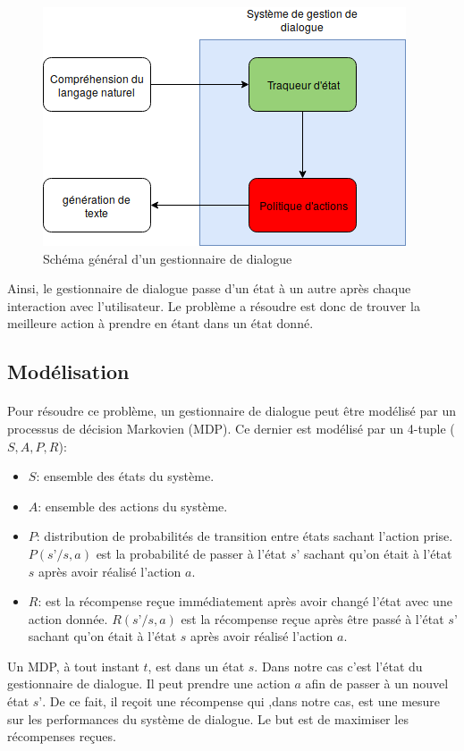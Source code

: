 \begin{figure}[H]
	\centering
	\includegraphics[width=.7\linewidth]{images/DM/DMGeneral.png} 
	\caption{Schéma général d'un gestionnaire de dialogue} 
\end{figure}
\par Ainsi, le gestionnaire de dialogue passe d'un état à un autre après chaque interaction avec l'utilisateur. Le problème a résoudre est donc de trouver la meilleure action à prendre en étant dans un état donné.
	\subsection{Modélisation}\label{MDP}
	\paragraph{}Pour résoudre ce problème, un gestionnaire de dialogue peut être modélisé par un processus de décision Markovien (MDP)\cite{Bel1957}. Ce dernier est modélisé par un 4-tuple ($S,A,P,R$):
	\begin{itemize}
		\item $S$: ensemble des états du système.
		\item $A$: ensemble des actions du système.
		\item $P$: distribution de probabilités de transition entre états sachant l’action prise. $P(s’/s,a)$ est la probabilité de passer à l’état $s’$ sachant qu’on était à l’état $s$ après avoir réalisé l’action $a$.
		\item $R$: est la récompense reçue immédiatement après avoir changé l’état avec une action donnée. $R(s’/s,a)$ est la récompense reçue après être passé à l’état $s’$ sachant qu’on était à l’état $s$ après avoir réalisé l’action $a$.
	\end{itemize}
	Un MDP, à tout instant $t$, est dans un état $s$. Dans notre cas c’est l’état du gestionnaire de dialogue. Il peut prendre une action $a$ afin de passer à un nouvel état $s’$. De ce fait, il reçoit une récompense qui ,dans notre cas, est une mesure sur les performances du système de dialogue. Le but est de maximiser les récompenses reçues.
	
